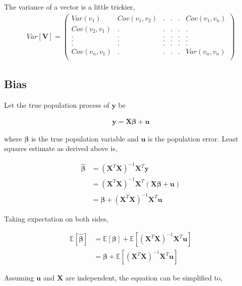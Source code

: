 \documentclass[11pt, a4paper]{article}
\begin{document}
The variance of a vector is a little trickier,
\begin{align*}
	Var[\mathbf{V}] = \begin{pmatrix} Var(v_1) & Cov(v_1, v_2) & . & . & . & Cov(v_1, v_n) \\ Cov(v_2, v_1) & . & . & . & . & . \\ . & . & . & . & . & . \\ . & . & . & . & . & . \\ . & . & . & . & . & . \\ Cov(v_n, v_1) & . & . & . & . & Var(v_n, v_n) \\ \end{pmatrix}
\end{align*}

\subsection{Bias}
Let the true population process of $\mathbf{y}$ be

\begin{align*}
	\mathbf{y} = \mathbf{X}\boldsymbol{\beta} + \mathbf{u} 
\end{align*}

where $\boldsymbol{\beta}$ is the true population variable and $\mathbf{u}$ is the population error. Least squares estimate as derived above is,

\begin{align*}
	\boldsymbol{\hat{\beta}} & = (\mathbf{X}^T\mathbf{X})^{-1}\mathbf{X}^T\mathbf{y}                                   \\
	                         & = (\mathbf{X}^T\mathbf{X})^{-1}\mathbf{X}^T (\mathbf{X}\boldsymbol{\beta} + \mathbf{u}) \\
	                         & = \boldsymbol{\beta} + (\mathbf{X}^T\mathbf{X})^{-1}\mathbf{X}^T\mathbf{u}              
\end{align*}

Taking expectation on both sides,

\begin{align*}
	\mathbb{E}[\hat{\boldsymbol{\beta}}] & = \mathbb{E}[\boldsymbol{\beta}] + \mathbb{E}[(\mathbf{X}^T\mathbf{X})^{-1}\mathbf{X}^T\mathbf{u}] \\
	                                     & = \boldsymbol{\beta} + \mathbb{E}[(\mathbf{X}^T\mathbf{X})^{-1}\mathbf{X}^T\mathbf{u}]             
\end{align*}

Assuming $\mathbf{u}$ and $\mathbf{X}$ are independent, the equation can be simplified to,
\end{document}
